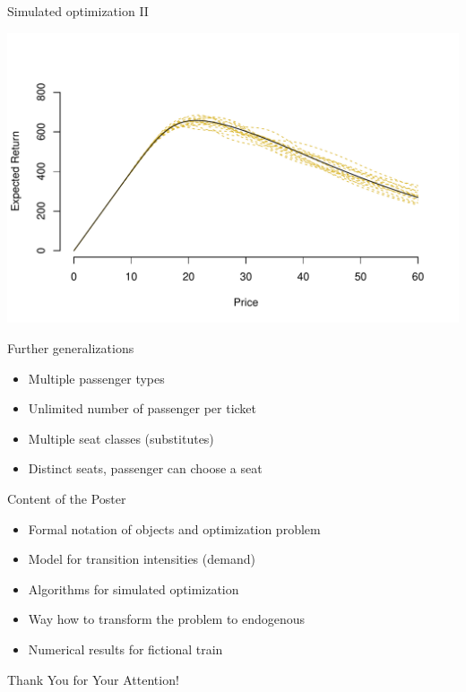 \documentclass[10pt]{beamer}
\begin{document}
\begin{frame}[fragile]{Simulated optimization II}
	
	\begin{center}
		\includegraphics[width=\textwidth]{figures/newsboy.pdf}
	\end{center}
\end{frame}

\begin{frame}[fragile]{Further generalizations}
  
	\begin{itemize}
		\item Multiple passenger types
		\item Unlimited number of passenger per ticket
		\item Multiple seat classes (substitutes)
		\item Distinct seats, passenger can choose a seat
	\end{itemize}

\end{frame}

\begin{frame}[fragile]{Content of the Poster}
  
	\begin{itemize}
		\item Formal notation of objects and optimization problem
		\item Model for transition intensities (demand)
		\item Algorithms for simulated optimization
		\item Way how to transform the problem to endogenous
		\item Numerical results for fictional train
	\end{itemize}

\end{frame}

\begin{frame}[standout]
  Thank You for Your Attention!
\end{frame}
\end{document}
